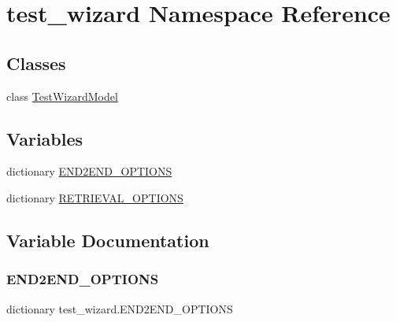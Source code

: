 \hypertarget{namespacetest__wizard}{}\section{test\+\_\+wizard Namespace Reference}
\label{namespacetest__wizard}
\subsection*{Classes}
\begin{DoxyCompactItemize}
\item 
class \hyperlink{classtest__wizard_1_1TestWizardModel}{Test\+Wizard\+Model}
\end{DoxyCompactItemize}
\subsection*{Variables}
\begin{DoxyCompactItemize}
\item 
dictionary \hyperlink{namespacetest__wizard_af6ffdbd4dab5e08b88ed0eda2622b06b}{E\+N\+D2\+E\+N\+D\+\_\+\+O\+P\+T\+I\+O\+NS}
\item 
dictionary \hyperlink{namespacetest__wizard_a007066f16642cc2aa5f021c2d4b2e794}{R\+E\+T\+R\+I\+E\+V\+A\+L\+\_\+\+O\+P\+T\+I\+O\+NS}
\end{DoxyCompactItemize}


\subsection{Variable Documentation}
\mbox{\label{namespacetest__wizard_af6ffdbd4dab5e08b88ed0eda2622b06b}} 
\subsubsection{\texorpdfstring{E\+N\+D2\+E\+N\+D\+\_\+\+O\+P\+T\+I\+O\+NS}{END2END\_OPTIONS}}
{\footnotesize\ttfamily dictionary test\+\_\+wizard.\+E\+N\+D2\+E\+N\+D\+\_\+\+O\+P\+T\+I\+O\+NS}

